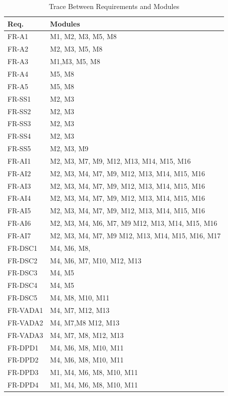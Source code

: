 \documentclass[12pt, titlepage]{article}
\begin{document}
\begin{table}[H]
\centering
\begin{tabular}{p{} p{}}
\toprule
\textbf{Req.} & \textbf{Modules}\\
\midrule
FR-A1 & M1, M2, M3, M5, M8 \\
FR-A2 &  M2, M3,  M5, M8 \\
FR-A3 &  M1,M3, M5, M8 \\
FR-A4 & M5, M8\\
FR-A5 & M5, M8 \\
FR-SS1 & M2, M3 \\
FR-SS2 & M2, M3\\
FR-SS3 & M2, M3\\
FR-SS4 & M2, M3 \\
FR-SS5 & M2, M3, M9\\
FR-AI1 & M2, M3, M7, M9, M12, M13, M14, M15, M16 \\
FR-AI2 & M2, M3, M4, M7, M9, M12, M13, M14, M15, M16 \\
FR-AI3 & M2, M3, M4, M7, M9, M12, M13, M14, M15, M16 \\
FR-AI4 & M2, M3, M4, M7, M9, M12, M13, M14, M15, M16 \\
FR-AI5 & M2, M3, M4, M7, M9, M12, M13, M14, M15, M16 \\
FR-AI6 & M2, M3, M4, M6, M7, M9 M12, M13, M14, M15, M16 \\
FR-AI7 & M2, M3, M4, M7, M9 M12, M13, M14, M15, M16, M17 \\
FR-DSC1 & M4, M6, M8, \\
FR-DSC2 & M4, M6, M7, M10, M12, M13 \\
FR-DSC3 & M4, M5\\
FR-DSC4 & M4, M5 \\
FR-DSC5 & M4, M8, M10, M11 \\
FR-VADA1 & M4, M7, M12, M13 \\
FR-VADA2 & M4, M7,M8 M12, M13 \\
FR-VADA3 & M4, M7, M8, M12, M13 \\
FR-DPD1 & M4, M6, M8, M10, M11 \\
FR-DPD2 & M4, M6, M8, M10, M11\\
FR-DPD3 & M1, M4, M6, M8, M10, M11\\
FR-DPD4 & M1, M4, M6, M8, M10, M11\\


\bottomrule
\end{tabular}
\caption{Trace Between Requirements and Modules}
\label{TblRT}
\end{table}
\end{document}
